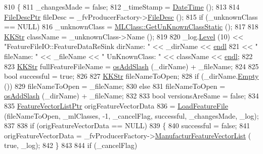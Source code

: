 \begin{DoxyCode}
810 \{
811   \_changesMade = \textcolor{keyword}{false};
812   \_timeStamp = \hyperlink{class_k_k_b_1_1_date_time}{DateTime} ();
813 
814   \hyperlink{class_k_k_m_l_l_1_1_file_desc}{FileDescPtr}  fileDesc = \_fvProducerFactory->\hyperlink{class_k_k_m_l_l_1_1_factory_f_v_producer_ab2dea2e51cf9d6a109b52300619e185c}{FileDesc} ();
815   \textcolor{keywordflow}{if}  (\_unknownClass == NULL)
816     \_unknownClass = \hyperlink{class_k_k_m_l_l_1_1_m_l_class_adb5daed2642585c91e0cdc5e9d472c7e}{MLClass::GetUnKnownClassStatic} ();
817 
818   \hyperlink{class_k_k_b_1_1_k_k_str}{KKStr}  className = \_unknownClass->Name ();
819 
820   \_log.\hyperlink{class_k_k_b_1_1_run_log_a32cf761d7f2e747465fd80533fdbb659}{Level} (10) << \textcolor{stringliteral}{"FeatureFileIO::FeatureDataReSink  dirName: "} << \_dirName << 
      \hyperlink{namespace_k_k_b_ad1f50f65af6adc8fa9e6f62d007818a8}{endl}
821                   << \textcolor{stringliteral}{"               fileName: "} << \_fileName << \textcolor{stringliteral}{"  UnKnownClass: "} << className << 
      \hyperlink{namespace_k_k_b_ad1f50f65af6adc8fa9e6f62d007818a8}{endl};
822 
823   \hyperlink{class_k_k_b_1_1_k_k_str}{KKStr}  fullFeatureFileName = \hyperlink{namespace_k_k_b_aa0d40119b911df4283399a1724cab1ef}{osAddSlash} (\_dirName) +  \_fileName;
824 
825   \textcolor{keywordtype}{bool}  successful = \textcolor{keyword}{true};
826 
827   \hyperlink{class_k_k_b_1_1_k_k_str}{KKStr} fileNameToOpen;
828   \textcolor{keywordflow}{if}  (\_dirName.\hyperlink{class_k_k_b_1_1_k_k_str_ac69942f73fffd672ec2a6e1c410afdb6}{Empty} ())
829     fileNameToOpen = \_fileName;
830   \textcolor{keywordflow}{else}
831     fileNameToOpen = \hyperlink{namespace_k_k_b_aa0d40119b911df4283399a1724cab1ef}{osAddSlash} (\_dirName) + \_fileName;
832 
833   \textcolor{keywordtype}{bool}  versionsAreSame = \textcolor{keyword}{false};
834 
835   \hyperlink{class_k_k_m_l_l_1_1_feature_vector_list}{FeatureVectorListPtr}  origFeatureVectorData 
836         = \hyperlink{class_k_k_m_l_l_1_1_feature_file_i_o_a75a8d10d3981811ab10357f6a95c9bc1}{LoadFeatureFile} (fileNameToOpen, \_mlClasses, -1, \_cancelFlag, successful, 
      \_changesMade, \_log);
837 
838   \textcolor{keywordflow}{if}  (origFeatureVectorData == NULL)
839   \{
840     successful = \textcolor{keyword}{false};
841     origFeatureVectorData = \_fvProducerFactory->\hyperlink{class_k_k_m_l_l_1_1_factory_f_v_producer_a96126b7adb55f6751450ede393c93086}{ManufacturFeatureVectorList} (\textcolor{keyword}{
      true}, \_log);
842   \}
843 
844   \textcolor{keywordflow}{if}  (\_cancelFlag)

\end{DoxyCode}
